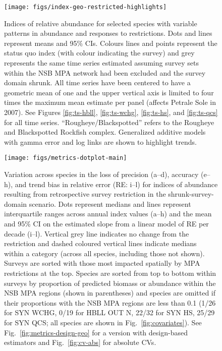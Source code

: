 \documentclass[12pt]{article}
\begin{document}

\begin{figure}[htb]
    \centering
    \texttt{[image: figs/index-geo-restricted-highlights]}
    \caption{Indices of relative abundance for selected species with variable patterns in abundance and responses to restrictions. Dots and lines represent means and 95\% CIs. Colours lines and points represent the status quo index (with colour indicating the survey) and grey represents the same time series estimated assuming survey sets within the NSB MPA network had been excluded and the survey domain shrunk. All time series have been centered to have a geometric mean of one and the upper vertical axis is limited to four times the maximum mean estimate per panel (affects Petrale Sole in 2007). See Figures \ref{fig:ts-hbll}, \ref{fig:ts-wchg}, \ref{fig:ts-hs}, and \ref{fig:ts-qcs} for all time series. ``Rougheye/Blackspotted'' refers to the Rougheye and Blackspotted Rockfish complex. Generalized additive models with gamma error and log links are shown to highlight trends.}
    \label{fig:timeseries}
\end{figure}

\begin{figure}[htb]
    \centering
    \texttt{[image: figs/metrics-dotplot-main]}
    \caption{Variation across species in the loss of precision (a--d), accuracy (e--h), and trend bias in relative error (RE: i--l) for indices of abundance resulting from retrospective survey restriction in the shrunk-survey-domain scenario. Dots represent medians and lines represent interquartile ranges across annual index values (a--h) and the mean and 95\% CI on the estimated slope from a linear model of RE per decade (i--l). Vertical grey line indicates no change from the restriction and dashed coloured vertical lines indicate medians within a category (across all species, including those not shown). Surveys are sorted with those most impacted spatially by MPA restrictions at the top. Species are sorted from top to bottom within surveys by proportion of predicted biomass or abundance within the NSB MPA regions (shown in parentheses) and species are omitted if their proportions with the NSB MPA regions are less than 0.1 (1/26 for SYN WCHG, 0/19 for HBLL OUT N, 22/32 for SYN HS, 25/29 for SYN QCS; all species are shown in Fig.~\ref{fig:covariates}). See Fig.~\ref{fig:metrics-design-geo} for a version with design-based estimators and Fig.~\ref{fig:cv-abs} for absolute CVs. }
    \label{fig:dotplot}
\end{figure}
\end{document}

